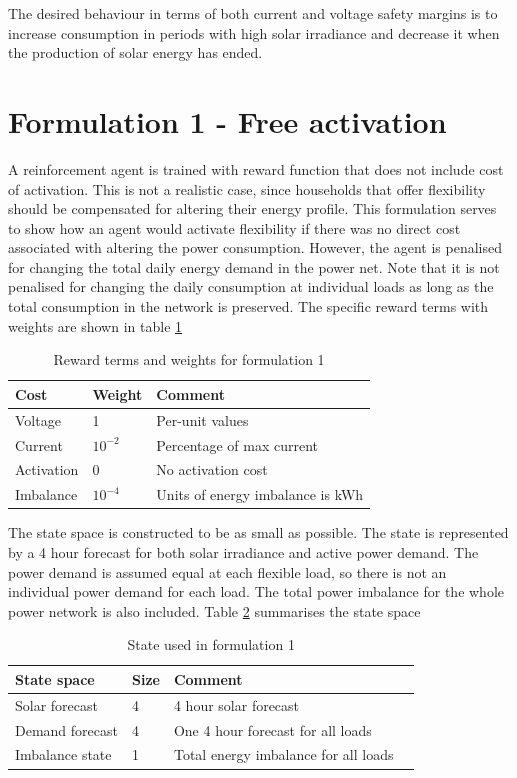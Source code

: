 \documentclass[class=book, crop=false]{standalone}
\begin{document}
The desired behaviour in terms of both current and voltage safety margins is to increase consumption in periods with high solar irradiance and decrease it when the production of solar energy has ended.


\section{Formulation 1 - Free activation} \label{section:result:config1}
A reinforcement agent is trained with reward function that does not include cost of activation. This is not a realistic case, since households that offer flexibility should be compensated for altering their energy profile. This formulation serves to show how an agent would activate flexibility if there was no direct cost associated with altering the power consumption. However, the agent is penalised for changing the total daily energy demand in the power net. Note that it is not penalised for changing the daily consumption at individual loads as long as the total consumption in the network is preserved. The specific reward terms with weights are shown in table \ref{table:results:reward_formulation1}

\begin{table}[h]
\centering
\begin{tabular}{l|ll}

Cost  & Weight & Comment
\\ 
\hline
Voltage &
1 &
Per-unit values
\\
Current &
$10^{-2}$ &
Percentage of max current 
\\
Activation &
0&
No activation cost
\\
Imbalance &
$10^{-4}$&
Units of energy imbalance is kWh
\\
\hline
\end{tabular}
\caption{Reward terms and weights for formulation 1}
\label{table:results:reward_formulation1}
\end{table}
The state space is constructed to be as small as possible. The state is represented by a 4 hour forecast for both solar irradiance and active power demand. The power demand is assumed equal at each flexible load, so there is not an individual power demand for each load. The total power imbalance for the whole power network is also included. Table \ref{table:results:state_formulation1} summarises the state space

\begin{table}[h]
\centering
\begin{tabular}{l|lll}

State space  & Size & Comment
\\ 
\hline
Solar forecast      &  4  &  4 hour solar forecast
\\ 

Demand forecast    &4 & One 4 hour forecast for all loads
\\ 
Imbalance state & 1  & Total energy imbalance for all loads
\\
\hline
\end{tabular}
\caption{State used in formulation 1}
\label{table:results:state_formulation1}
\end{table}
\end{document}
